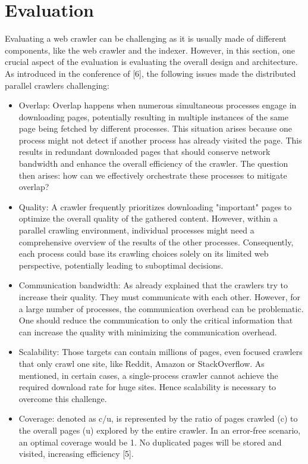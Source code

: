 \chapter{Evaluation}
\label{chap:evaluation}
Evaluating a web crawler can be challenging as it is usually made of different components, like the web crawler and the indexer. However, in this section, one crucial aspect of the evaluation is evaluating the overall design and architecture. As introduced in the conference of [6], the following issues made the distributed parallel crawlers challenging:   

\begin{itemize}
  \item Overlap: Overlap happens when numerous simultaneous processes engage in downloading pages, potentially resulting in multiple instances of the same page being fetched by different processes. This situation arises because one process might not detect if another process has already visited the page. This results in redundant downloaded pages that should conserve network bandwidth and enhance the overall efficiency of the crawler. The question then arises: how can we effectively orchestrate these processes to mitigate overlap?
  \item Quality: A crawler frequently prioritizes downloading "important" pages to optimize the overall quality of the gathered content. However, within a parallel crawling environment, individual processes might need a comprehensive overview of the results of the other processes. Consequently, each process could base its crawling choices solely on its limited web perspective, potentially leading to suboptimal decisions.
  \item Communication bandwidth: As already explained that the crawlers try to increase their quality. They must communicate with each other. However, for a large number of processes, the communication overhead can be problematic. One should reduce the communication to only the critical information that can increase the quality with minimizing the communication overhead. 
  \item Scalability: Those targets can contain millions of pages, even focused crawlers that only crawl one site, like Reddit, Amazon or StackOverflow. As mentioned, in certain cases, a single-process crawler cannot achieve the required download rate for huge sites. Hence scalability is necessary to overcome this challenge.
  \item Coverage: denoted as c/u, is represented by the ratio of pages crawled (c) to the overall pages (u) explored by the entire crawler. In an error-free scenario, an optimal coverage would be 1. No duplicated pages will be stored and visited, increasing efficiency [5].
\end{itemize}
